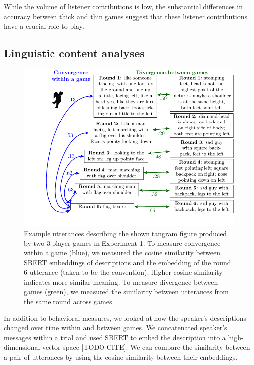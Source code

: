 \documentclass[
  english,
  a4paper,
]{article}
\begin{document}
While the volume of listener contributions is low, the substantial differences in accuracy between thick and thin games suggest that these listener contributions have a crucial role to play.

\hypertarget{linguistic-content-analyses}{%
\subsection{Linguistic content analyses}\label{linguistic-content-analyses}}

\begin{figure}[t!]

{\centering \includegraphics[width=1\linewidth]{sbert} 

}

\caption{Example utterances describing the shown tangram figure produced by two 3-player games in Experiment 1. To measure convergence within a game (blue), we measured the cosine similarity between SBERT embeddings of descriptions and the embedding of the round 6 utterance (taken to be the convention). Higher cosine similarity indicates more similar meaning. To measure divergence between games (green), we measured the similarity between utterances from the same round across games.}\label{fig:sbert-diagram}
\end{figure}

In addition to behavioral measures, we looked at how the speaker's descriptions changed over time within and between games. We concatenated speaker's messages within a trial and used SBERT to embed the description into a high-dimensional vector space {[}TODO CITE{]}. We can compare the similarity between a pair of utterances by using the cosine similarity between their embeddings.
\end{document}

